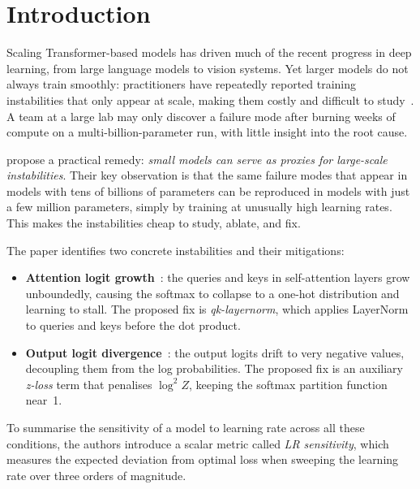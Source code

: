 \section{Introduction}
\label{sec:introduction}

Scaling Transformer-based models has driven much of the recent progress in
deep learning, from large language models to vision systems.
Yet larger models do not always train smoothly: practitioners have repeatedly
reported training instabilities that only appear at scale, making them costly
and difficult to study~\cite{chowdhery2022palm, dehghani2023scaling}.
A team at a large lab may only discover a failure mode after burning weeks of
compute on a multi-billion-parameter run, with little insight into the root
cause.

\citet{wortsman2023smallscale} propose a practical remedy: \emph{small models
can serve as proxies for large-scale instabilities}.
Their key observation is that the same failure modes that appear in models with
tens of billions of parameters can be reproduced in models with just a few
million parameters, simply by training at unusually high learning rates.
This makes the instabilities cheap to study, ablate, and fix.

The paper identifies two concrete instabilities and their mitigations:
\begin{itemize}
  \item \textbf{Attention logit growth}~\cite{dehghani2023scaling}: the
    queries and keys in self-attention layers grow unboundedly, causing the
    softmax to collapse to a one-hot distribution and learning to stall.
    The proposed fix is \emph{qk-layernorm}, which applies LayerNorm to
    queries and keys before the dot product.
  \item \textbf{Output logit divergence}~\cite{chowdhery2022palm}: the output
    logits drift to very negative values, decoupling them from the log
    probabilities.
    The proposed fix is an auxiliary \emph{z-loss} term that penalises
    $\log^2 Z$, keeping the softmax partition function near~1.
\end{itemize}

To summarise the sensitivity of a model to learning rate across all these
conditions, the authors introduce a scalar metric called \emph{LR sensitivity},
which measures the expected deviation from optimal loss when sweeping the
learning rate over three orders of magnitude.

